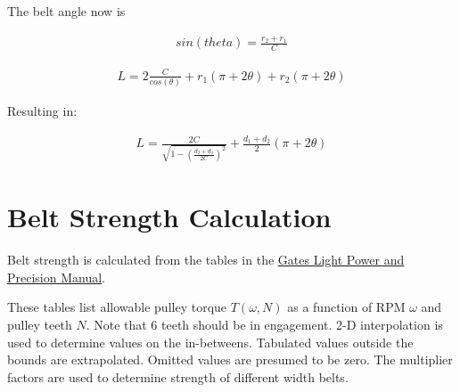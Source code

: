 \documentclass[10pt,letterpaper]{article}
\begin{document}
	The belt angle now is

	\begin{align}
		sin(theta) = \frac{r_2 + r_1}{C} 
	\end{align}

	\begin{align}
		L = 2 \frac{C}{cos(\theta)} + r_1 (\pi + 2 \theta) + r_2 (\pi + 2 \theta)
	\end{align}

	Resulting in:

	\begin{align}
		L = \frac{2 C}{\sqrt{1 - (\frac{d_2 + d_1}{2 C})^2}} + \frac{d_1 + d_2}{2} (\pi + 2 \theta)
	\end{align}

	\section*{Belt Strength Calculation}

	Belt strength is calculated from the tables in the \href{https://www.gates.com/content/dam/gates/home/resources/resource-library/catalogs/light-power-and-precision-manual.pdf}{\underline{Gates Light Power and Precision Manual}}.

	These tables list allowable pulley torque $T(\omega, N)$ as a function of RPM $\omega$ and pulley teeth $N$. Note that 6 teeth should be in engagement.
	2-D interpolation is used to determine values on the in-betweens.
	Tabulated values outside the bounds are extrapolated. Omitted values are presumed to be zero.
	The multiplier factors are used to determine strength of different width belts.
	
	
\end{document}
